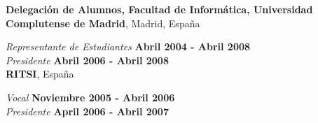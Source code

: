\documentclass[margin,line]{resume}
\begin{document}
\begin{resume}
{\bf Delegación de Alumnos, Facultad de Informática, Universidad Complutense de
Madrid}, Madrid, España

\vspace{-.3cm}
{\em Representante de Estudiantes} \hfill {\bf Abril 2004 - Abril 2008}\\
{\em Presidente} \hfill {\bf Abril 2006 - Abril 2008}\\

{\bf RITSI}, España

\vspace{-.3cm}
{\em Vocal} \hfill {\bf  Noviembre 2005 - Abril 2006}\\
{\em Presidente} \hfill {\bf  April 2006 - Abril 2007}\\

%




\end{resume}
\end{document}
